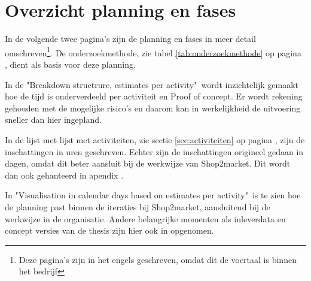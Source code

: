 
\chapter{Overzicht planning en fases}
\label{app:planning}

In de volgende twee pagina's zijn de planning en fases in meer detail omschreven\footnote{ Deze pagina's zijn in het engels geschreven, omdat dit de voertaal is binnen het bedrijf }. De onderzoekmethode, zie tabel \ref{tab:onderzoekmethode} op pagina \pageref{tab:onderzoekmethode}, dient als basis voor deze planning.
\newline

In de "Breakdown structrure, estimates per activity"\ wordt inzichtelijk gemaakt hoe de tijd is onderverdeeld per activiteit en Proof of concept. Er wordt rekening gehouden met de mogelijke risico's en daarom kan in werkelijkheid de uitvoering sneller dan hier ingepland.

In de lijst met lijst met activiteiten, zie sectie \ref{sec:activiteiten} op pagina \pageref{sec:activiteiten}, zijn de inschattingen in uren geschreven. Echter zijn de inschattingen origineel gedaan in dagen, omdat dit beter aansluit bij de werkwijze van Shop2market. Dit wordt dan ook gehanteerd in apendix \label{app:planning}.
\newline

In "Visualisation in calendar days based on estimates per activity"\ is te zien hoe de planning past binnen de iteraties bij Shop2market, aansluitend bij de werkwijze in de organisatie. Andere belangrijke momenten als inleverdata en concept versies van de thesis zijn hier ook in opgenomen.


